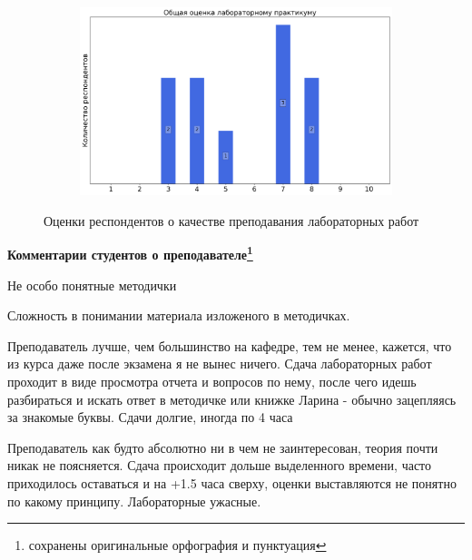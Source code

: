 \begin{figure}[H]
\begin{subfigure}[b]{0.45\textwidth}
			\end{subfigure}
			\begin{subfigure}[b]{0.45\textwidth}
				\centering
				\includegraphics[width=\textwidth]{images/3 course/Аналоговая электроника/labniks-marks-Русскин С.О.-3.png}
			\end{subfigure}	
			\caption{Оценки респондентов о качестве преподавания лабораторных работ}
		\end{figure}

		\textbf{Комментарии студентов о преподавателе\protect\footnote{сохранены оригинальные орфография и пунктуация}}
            \begin{commentbox} 
                Не особо понятные методички 
            \end{commentbox} 

            \begin{commentbox} 
                Сложность в понимании материала изложеного в методичках.  
            \end{commentbox} 

            \begin{commentbox} 
                Преподаватель лучше, чем большинство на кафедре, тем не менее, кажется, что из курса даже после экзамена я не вынес ничего. Сдача лабораторных работ проходит в виде просмотра отчета и вопросов по нему, после чего идешь разбираться и искать ответ в методичке или книжке Ларина - обычно зацепляясь за знакомые буквы. Сдачи долгие, иногда по 4 часа 
            \end{commentbox} 

            \begin{commentbox} 
                Преподаватель как будто абсолютно ни в чем не заинтересован, теория почти никак не поясняется. Сдача происходит дольше выделенного времени, часто приходилось оставаться и на +1.5 часа сверху, оценки выставляются не понятно по какому принципу. Лабораторные ужасные. 
            \end{commentbox}


